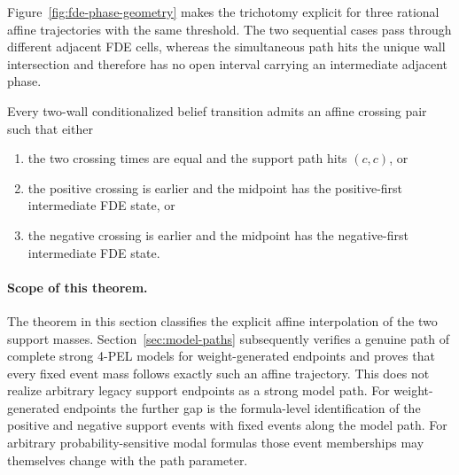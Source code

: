 

Figure~\ref{fig:fde-phase-geometry} makes the trichotomy explicit for three rational affine trajectories with the same threshold. The two sequential cases pass through different adjacent FDE cells, whereas the simultaneous path hits the unique wall intersection and therefore has no open interval carrying an intermediate adjacent phase.

\begin{theorem}
Every two-wall conditionalized belief transition admits an affine crossing pair such that either
\begin{enumerate}[label=(\roman*)]
  \item the two crossing times are equal and the support path hits \((c,c)\), or
  \item the positive crossing is earlier and the midpoint has the positive-first intermediate FDE state, or
  \item the negative crossing is earlier and the midpoint has the negative-first intermediate FDE state.
\end{enumerate}
\statusverified
\end{theorem}

\paragraph{Scope of this theorem.}
The theorem in this section classifies the explicit affine interpolation of the two support masses. Section~\ref{sec:model-paths} subsequently verifies a genuine path of complete strong 4-PEL models for weight-generated endpoints and proves that every fixed event mass follows exactly such an affine trajectory. This does not realize arbitrary legacy support endpoints as a strong model path. For weight-generated endpoints the further gap is the formula-level identification of the positive and negative support events with fixed events along the model path. For arbitrary probability-sensitive modal formulas those event memberships may themselves change with the path parameter.
